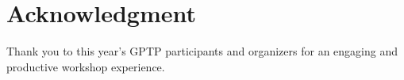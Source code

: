\section*{Acknowledgment}

Thank you to this year's GPTP participants and organizers for an engaging and productive workshop experience.
